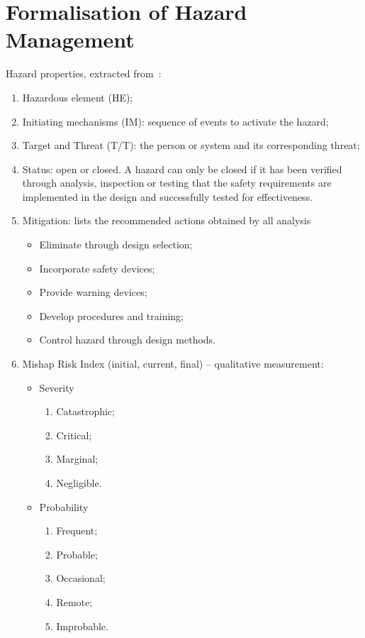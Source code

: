 \chapter{Formalisation of Hazard Management}

Hazard properties, extracted from~\cite{ericsonII2005}:
%
\begin{enumerate}
  \item Hazardous element (HE);
  \item Initiating mechanisms (IM): sequence of events to activate the hazard;
  \item Target and Threat (T/T): the person or system and its corresponding threat;
  \item Status: open or closed. A hazard can only be closed if it has been verified through analysis, inspection or testing that the safety requirements are implemented in the design and successfully tested for effectiveness.
  \item Mitigation: lists the recommended actions obtained by all analysis
  \begin{itemize}
    \item Eliminate through design selection;
    \item Incorporate safety devices;
    \item Provide warning devices;
    \item Develop procedures and training;
    \item Control hazard through design methods.
  \end{itemize}
  \item Mishap Risk Index (initial, current, final) -- qualitative measurement:
  \begin{itemize}
    \item Severity
    \begin{enumerate}
      \item Catastrophic;
      \item Critical;
      \item Marginal;
      \item Negligible.
    \end{enumerate}
    \item Probability
    \begin{enumerate}
      \item Frequent;
      \item Probable;
      \item Occasional;
      \item Remote;
      \item Improbable.
    \end{enumerate}
  \end{itemize} 
\end{enumerate}

